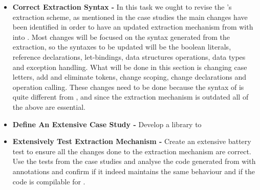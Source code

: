 \begin{itemize}

\item \textbf{Correct Extraction Syntax -} In this task we ought to revise the \whythree's extraction scheme, as mentioned in the case
studies the main changes have been identified in order to have an updated extraction mechanism from \ocaml with \gospel into \cml. Most
changes will be focused on the syntax generated from the extraction, so the syntaxes to be updated will be the boolean literals, reference
declarations, let-bindings, data structures operations, data types and exception handling. What will be done in this section is changing
case letters, add and eliminate tokens, change scoping, change declarations and operation calling. These changes need to be done because 
the syntax of \ocaml is quite different from \cml, and since the extraction mechanism is outdated all of the above are essential.


\item \textbf{Define An Extensive Case Study -} Develop a library to 

\item \textbf{Extensively Test Extraction Mechanism -} Create an extensive battery test to ensure all the changes done to the extraction
mechanism are correct. Use the tests from the case studies and analyse the code generated from \ocaml with \gospel annotations and
confirm if it indeed maintains the same behaviour and if the code is compilable for \cml.






\end{itemize}
